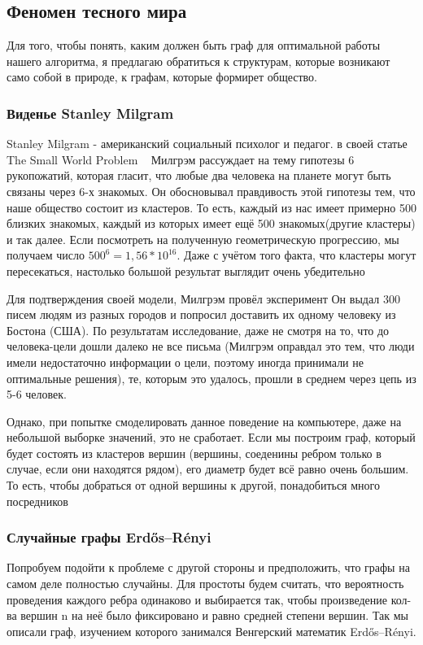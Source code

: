 \subsection{Феномен тесного мира}

Для того, чтобы понять, каким должен быть граф для 
оптимальной работы нашего алгоритма, я предлагаю обратиться
к структурам, которые возникают само собой в приро\-де, 
к графам, которые формирет общество.

\subsubsection{Виденье Stanley Milgram}
Stanley Milgram - американский социальный психолог и педагог.
в своей статье The Small World Problem ~\cite{TheSmallWorldProblem}
Милгрэм рассуждает на тему гипотезы 6 рукопожатий, которая гласит, что 
любые два человека на планете могут быть связаны через 6-х
знакомых. Он обосновывал правдивость этой гипотезы тем, что наше
общество состоит из кластеров. То есть, каждый из нас имеет примерно 500
близких знакомых, каждый из которых имеет ещё 500 знакомых(другие кластеры)
и так далее. Если посмотреть на полученную геометрическую прогрессию, мы
получаем число $ 500^6 = 1,56 * 10^{16} $. Даже с учётом того факта, что
кластеры могут пересекаться, настолько большой результат выглядит 
очень убедительно

Для подтверждения своей модели, Милгрэм провёл эксперимент
Он выдал 300 писем людям из разных городов и попросил доставить 
их одному человеку из Бостона (США). 
По результатам исследование, даже не смотря на то, что до человека-цели
дошли далеко не все письма (Милгрэм оправдал это тем, что люди имели
недостаточно информации о цели, поэтому иногда принимали не оптимальные
решения), те, которым это удалось, прошли в среднем через цепь из
5-6 человек. 

Однако, при попытке смоделировать данное поведение на компьютере, даже
на небольшой выборке значений, это не сработает. Если мы построим
граф, который будет состоять из кластеров вершин (вершины, соеденины
ребром только в случае, если они находятся рядом), его диаметр будет
всё равно очень большим. То есть, чтобы добраться от одной вершины
к другой, понадобиться много посредников

\subsubsection{Случайные графы Erdős–Rényi}
Попробуем подойти к проблеме с другой стороны и предположить, что
графы на самом деле полностью случайны. Для простоты будем считать,
что вероятность проведения каждого ребра одинаково и выбирается так,
чтобы произведение кол-ва вершин n на неё было фиксировано и равно
средней степени вершин. Так мы описали граф, изучением которого занимался
Венгерский математик Erdős–Rényi. 

